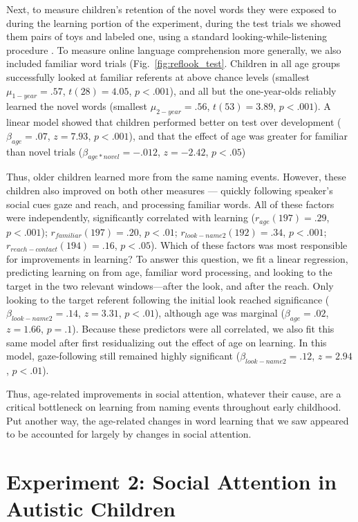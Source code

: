 \documentclass{pnastwo}
\begin{document}
\begin{article}
Next, to measure children's retention of the novel words they were exposed to during the learning portion of the experiment, during the test trials we showed them pairs of toys and labeled one, using a standard looking-while-listening procedure \cite{fernald1998, fernald2008}. To measure online language comprehension more generally, we also included familiar word trials (Fig.~\ref{fig:reflook_test}. Children in all age groups successfully looked at familiar referents at above chance levels (smallest $\mu_{1-year} = .57$, $t(28) = 4.05$, $p < .001$), and all but the one-year-olds reliably learned the novel words (smallest $\mu_{2-year} = .56$, $t(53) = 3.89$, $p < .001$). A linear model showed that children performed better on test over development ($\beta_{age} = .07$, $z = 7.93$, $p < .001$), and that the effect of age was greater for familiar than novel trials ($\beta_{age * novel} = -.012$, $z = -2.42$, $p < .05$)

Thus, older children learned more from the same naming events. However, these children also improved on both other measures --- quickly following speaker's social cues gaze and reach, and processing familiar words. All of these factors were independently, significantly correlated with learning ($r_{age}(197) = .29$, $p < .001$); $r_{familiar}(197) = .20$, $p < .01$; $r_{look-name2}(192) = .34$, $p < .001$; $r_{reach-contact}(194) = .16$, $p < .05$). Which of these factors was most responsible for improvements in learning? To answer this question, we fit a linear regression, predicting learning on from age, familiar word processing, and looking to the target in the two relevant windows---after the look, and after the reach. Only looking to the target referent following the initial look reached significance ($\beta_{look-name2} = .14$, $z = 3.31$, $p < .01$), although age was marginal ($\beta_{age} = .02$, $z = 1.66$, $p = .1$). Because these predictors were all correlated, we also fit this same model after first residualizing out the effect of age on learning. In this model, gaze-following still remained highly significant ($\beta_{look-name2} = .12$, $z = 2.94$, $p < .01$).

Thus, age-related improvements in social attention, whatever their cause, are a critical bottleneck on learning from naming events throughout early childhood. Put another way, the age-related changes in word learning that we saw appeared to be accounted for largely by changes in social attention.

\section{Experiment 2: Social Attention in Autistic Children}


\end{article}
\end{document}
